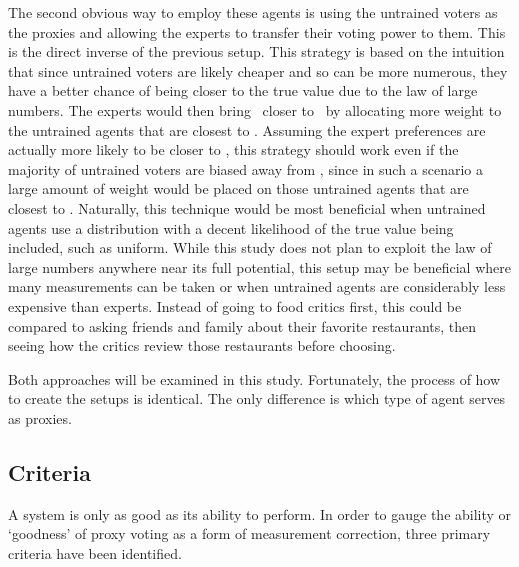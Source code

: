 The second obvious way to employ these agents is using the untrained voters
as the proxies and allowing the experts to transfer their voting power to them.
This is the direct inverse of the previous setup.
This strategy is based on the intuition that since untrained voters are likely
cheaper and so can be more numerous, they have a better chance of being closer
to the true value due to the law of large numbers.
The experts would then bring \systemtruth\ closer to \truth\ by allocating more
weight to the untrained agents that are closest to \truth.
Assuming the expert preferences are actually more likely to be closer to \truth,
this strategy should work even if the majority of untrained voters are biased away from
\truth, since in such a scenario a large amount of weight would be placed on those
untrained agents that are closest to \truth.
Naturally, this technique would be most beneficial when untrained agents use a
distribution with a decent likelihood of the true value being included, such
as uniform.
While this study does not plan to exploit the law of large numbers anywhere
near its full potential, this setup may be beneficial where many measurements
can be taken or when untrained agents are considerably less expensive than
experts.
Instead of going to food critics first, this could be compared to asking friends and
family about their favorite restaurants, then seeing how the critics review those
restaurants before choosing.

Both approaches will be examined in this study.
Fortunately, the process of how to create the setups is identical.
The only difference is which type of agent serves as proxies.

\subsection{Criteria}\label{subsec:criteria}
A system is only as good as its ability to perform.
In order to gauge the ability or `goodness' of proxy voting as a form of
measurement correction, three primary criteria have been identified.

